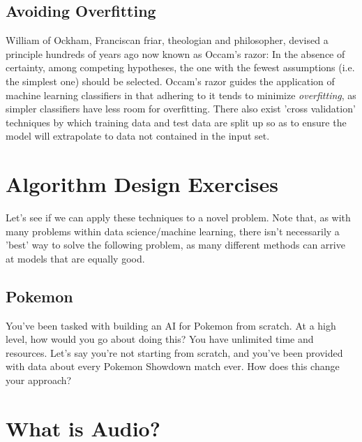 \documentclass[11pt]{article}
\begin{document}
\subsection{Avoiding Overfitting}
William of Ockham, Franciscan friar, theologian and philosopher, devised a principle hundreds of years ago now known as Occam's razor: In the absence of certainty, among competing hypotheses, the one with the fewest assumptions (i.e. the simplest one) should be selected. Occam's razor guides the application of machine learning classifiers in that adhering to it tends to minimize \textit{overfitting}, as simpler classifiers have less room for overfitting. There also exist 'cross validation' techniques by which training data and test data are split up so as to ensure the model will extrapolate to data not contained in the input set.

\section{Algorithm Design Exercises}
Let's see if we can apply these techniques to a novel problem. Note that, as with many problems within data science/machine learning, there isn't necessarily a 'best' way to solve the following problem, as many different methods can arrive at models that are equally good.
\subsection{Pokemon}
You've been tasked with building an AI for Pokemon from scratch. At a high level, how would you go about doing this? You have unlimited time and resources. 
Let's say you're not starting from scratch, and you've been provided with data about every Pokemon Showdown match ever. How does this change your approach?

\section{What is Audio?}
\end{document}
